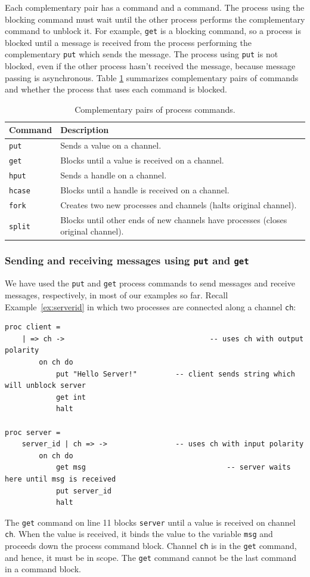 \documentclass[11pt]{article}
\begin{document}
Each complementary pair has a  command and a  command.
The process using the blocking command must wait until the other process performs the complementary command to unblock it. 
For example, \lstinline$get$ is a blocking command, so a process is blocked until a message is received from the process performing the complementary \lstinline$put$ which sends the message.
The process using \lstinline$put$ is not blocked, even if the other process hasn't received the message, because message passing is asynchronous.
Table \ref{tab:mpl-constructs} summarizes complementary pairs of commands and whether the process that uses each command is blocked.
 \begin{table}[!h]
\centering
	\begin{tabular}{|l|l|}
	\hline
	{\bf Command} & {\bf Description} \\
	\hline
	\lstinline$put$ & Sends a value on a channel. \\ 
	\lstinline$get$ & Blocks until a value is received on a channel. \\ \hline
	\lstinline$hput$ & Sends a handle on a channel. \\ 
	\lstinline$hcase$ & Blocks until a handle is received on a channel. \\ \hline
	\lstinline$fork$ & Creates two new processes and channels (halts original channel). \\ 
	\lstinline$split$ & Blocks until other ends of new channels have processes (closes original channel). \\ \hline
	\end{tabular}
\caption{Complementary pairs of process commands.}
\label{tab:mpl-constructs}
\end{table} 


\subsubsection{Sending and receiving messages using {\tt put} and {\tt get}}
\label{subsec:put-get}

We have used the \lstinline$put$ and \lstinline$get$ process commands to send messages and receive messages, respectively, in most of our examples so far.
Recall Example~\ref{ex:serverid} in which two processes are connected along a channel \lstinline$ch$:
\begin{lstlisting}
proc client =
	| => ch ->									-- uses ch with output polarity
		on ch do 
			put "Hello Server!"			-- client sends string which will unblock server
			get int					
			halt

proc server =
	server_id | ch => ->				-- uses ch with input polarity
		on ch do
			get msg									-- server waits here until msg is received
			put server_id						
			halt
\end{lstlisting}
The \lstinline$get$ command on line 11 blocks \lstinline$server$ until a value is received on channel \lstinline$ch$.
When the value is received, it binds the value to the variable \lstinline$msg$ and proceeds down the process command block. 
Channel \lstinline$ch$ is  in the \lstinline$get$ command, and hence, it must be in scope. 
The \lstinline$get$ command cannot be the last command in a command block. 
\end{document}
